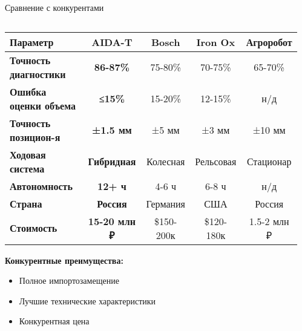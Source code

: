 \begin{frame}[t]{Сравнение с конкурентами}
    \begin{columns}[T]
        \begin{column}{0.65\textwidth}
            \vspace{0.3cm}
            \begin{table}[h!]
            \fontsize{8}{12}\selectfont
            \begin{tabular}{|l|c|c|c|c|}
            \hline
            \textbf{Параметр} & \textbf{\textcolor{aiblue}{AIDA-T}} & \textbf{Bosch} & \textbf{Iron Ox} & \textbf{Агроробот} \\
            \hline
            \textbf{Точность диагностики} & \textcolor{aigreen}{\textbf{86-87\%}} & 75-80\% & 70-75\% & 65-70\% \\
            \hline
            \textbf{Ошибка оценки объема} & \textcolor{aigreen}{\textbf{≤15\%}} & 15-20\% & 12-15\% & н/д \\
            \hline
            \textbf{Точность позицион-я} & \textcolor{aigreen}{\textbf{±1.5 мм}} & ±5 мм & ±3 мм & ±10 мм \\
            \hline
            \textbf{Ходовая система} & \textcolor{aigreen}{\textbf{Гибридная}} & Колесная & Рельсовая & Стационар \\
            \hline
            \textbf{Автономность} & \textcolor{aigreen}{\textbf{12+ ч}} & 4-6 ч & 6-8 ч & н/д \\
            \hline
            \textbf{Страна} & \textcolor{aigreen}{\textbf{Россия}} & Германия & США & Россия \\
            \hline
            \textbf{Стоимость} & \textcolor{aigreen}{\textbf{15-20 млн ₽}} & \$150-200к & \$120-180к & 1.5-2 млн ₽ \\
            \hline
            \end{tabular}
            \end{table}
            
            \vspace{0.3cm}
            \textbf{\textcolor{aiorange}{Конкурентные преимущества:}}
            \begin{itemize}
                \item Полное импортозамещение
                \item Лучшие технические характеристики
                \item Конкурентная цена
            \end{itemize}
        \end{column}
        \hfill
        \begin{column}{0.3\textwidth}
            \centering
            \vspace{1cm}
        \end{column}
    \end{columns}
    \end{frame}